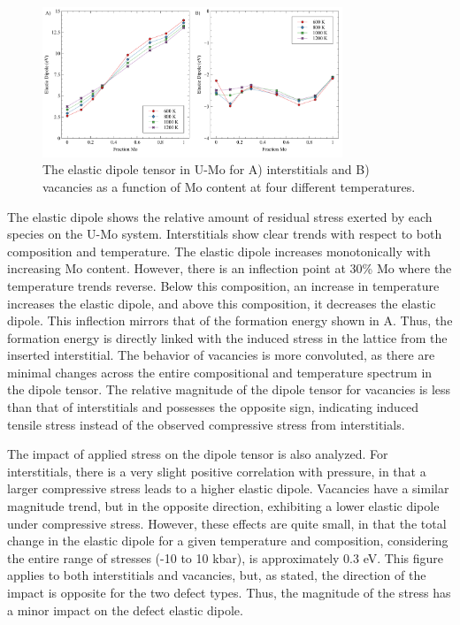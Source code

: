 \documentclass[review]{elsarticle}
\begin{document}
\begin{figure}[h!]
    \centering
    \includegraphics[width=0.8\textwidth]{dipole1.pdf}
    \caption{The elastic dipole tensor in U-Mo for A) interstitials and B) vacancies as a function of Mo content at four different temperatures.}
    \label{fig:dipole}
\end{figure}

The elastic dipole shows the relative amount of residual stress exerted by each species on the U-Mo system. Interstitials show clear trends with respect to both composition and temperature. The elastic dipole increases monotonically with increasing Mo content. However, there is an inflection point at 30\% Mo where the temperature trends reverse. Below this composition, an increase in temperature increases the elastic dipole, and above this composition, it decreases the elastic dipole. This inflection mirrors that of the formation energy shown in A. Thus, the formation energy is directly linked with the induced stress in the lattice from the inserted interstitial. The behavior of vacancies is more convoluted, as there are minimal changes across the entire compositional and temperature spectrum in the dipole tensor. The relative magnitude of the dipole tensor for vacancies is less than that of interstitials and possesses the opposite sign, indicating induced tensile stress instead of the observed compressive stress from interstitials. 

The impact of applied stress on the dipole tensor is also analyzed. For interstitials, there is a very slight positive correlation with pressure, in that a larger compressive stress leads to a higher elastic dipole. Vacancies have a similar magnitude trend, but in the opposite direction, exhibiting a lower elastic dipole under compressive stress. However, these effects are quite small, in that the total change in the elastic dipole for a given temperature and composition, considering the entire range of stresses (-10 to 10 kbar), is approximately 0.3 eV. This figure applies to both interstitials and vacancies, but, as stated, the direction of the impact is opposite for the two defect types. Thus, the magnitude of the stress has a minor impact on the defect elastic dipole. 
\end{document}
